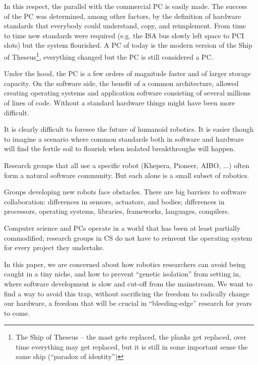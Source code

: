 In this respect, the parallel with the commercial PC is easily made. 
The success of the PC was determined, among other factors, by the definition 
of hardware standards that everybody could understand, copy, and reimplement. 
From time to time new standards were required (e.g. the ISA bus slowly left
space to PCI slots) but the system flourished. A PC of today is the modern 
version of the Ship of Theseus\footnote{The Ship of Theseus -- the mast gets replaced,
the planks get replaced, over time everything may get replaced,
but it is still in some important sense the same ship (``paradox
of identity'')}, everything changed but the PC is still considered
a PC. 
%

Under the hood, the PC is a few orders of magnitude faster and of larger
storage capacity. On the software side, the benefit of a common architecture, 
allowed creating operating systems and application software consisting of 
several millions of lines of code. Without a standard hardware things
might have been more difficult.

It is clearly difficult to foresee the future of humanoid robotics. It is
easier though to imagine a scenario where common standards both in software and
hardware will find the fertile soil to flourish when isolated breakthroughs 
will happen.



Research groups that all use a specific robot (Khepera, Pioneer, AIBO,
...) often form a natural software community.  But each alone is 
a small subset of robotics.

Groups developing new robots face obstacles.  There are big barriers
to software collaboration: differences in sensors, actuators, and
bodies; differences in processors, operating systems, libraries,
frameworks, languages, compilers.


Computer science and PCs operate in a world that has been at least
partially commodified; research groups in CS do not have to 
reinvent the operating system for every project they undertake.


%
In this paper, we are concerned
about how robotics researchers can avoid being caught in a tiny
niche, and how to prevent ``genetic isolation'' from setting in,
where software development is slow and cut-off from the mainstream.
We want to find a way to avoid this trap, without sacrificing
the freedom to radically change our hardware, a freedom that
will be crucial in ``bleeding-edge'' research for years to come.

